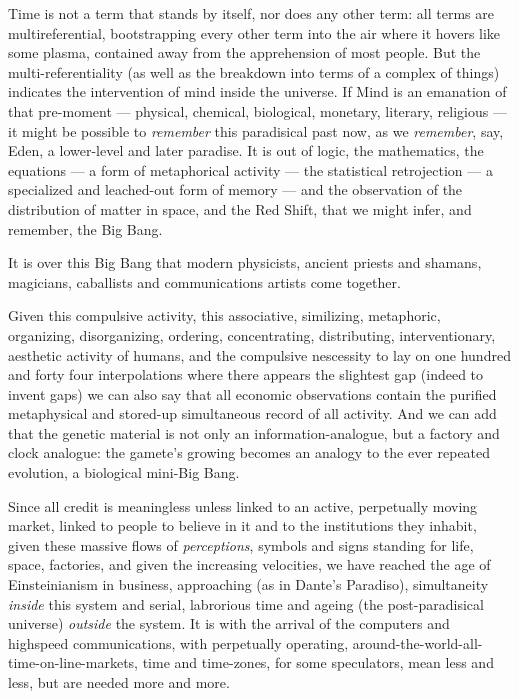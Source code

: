 Time is not a term that stands by itself, nor
does any other term: all terms are multireferential, bootstrapping every other term
into the air where it hovers like some plasma, contained away from the apprehension
of most people. But the multi-referentiality
(as well as the breakdown into terms of a
complex of things) indicates the intervention of mind inside the universe. If Mind is
an emanation of that pre-moment --- physical, chemical, biological, monetary, literary,
religious --- it might be possible to \emph{remember}
this paradisical past now, as we \emph{remember},
say, Eden, a lower-level and later paradise. It
is out of logic, the mathematics, the equations --- a form of metaphorical activity --- the
statistical retrojection --- a specialized and
leached-out form of memory --- and the observation of the distribution of matter in space,
and the Red Shift, that we might infer, and remember, the Big Bang.

It is over this Big Bang that modern physicists, ancient priests and shamans, magicians, caballists and communications artists come together.

Given this compulsive activity, this associative, similizing, metaphoric, organizing, disorganizing, ordering, concentrating,
distributing, interventionary, aesthetic activity of humans, and the compulsive nescessity
to lay on one hundred and forty four interpolations where there appears the slightest gap
(indeed to invent gaps) we can also say that
all economic observations contain the purified metaphysical and stored-up simultaneous record of all activity. And we can add
that the genetic material is not only an
information-analogue, but a factory and
clock analogue: the gamete's growing becomes an analogy to the ever repeated evolution, a biological mini-Big Bang.

Since all credit is meaningless unless
linked to an active, perpetually moving
market, linked to people to believe in it and
to the institutions they inhabit, given these
massive flows of \emph{perceptions}, symbols and
signs standing for life, space, factories, and
given the increasing velocities, we have
reached the age of Einsteinianism in business, approaching (as in Dante's Paradiso),
simultaneity \emph{inside} this system and serial,
labrorious time and ageing (the post-paradisical universe) \emph{outside} the system. It is
with the arrival of the computers and highspeed communications, with perpetually
operating, around-the-world-all-time-on-line-markets, time and time-zones,
for some speculators, mean less and less, but are
needed more and more.


